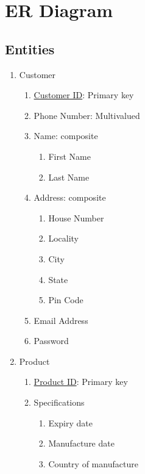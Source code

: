 \documentclass[12pt]{report}
\begin{document}
    \chapter{ER Diagram}
    \section{Entities}

    \begin{enumerate}
        \item Customer
            \begin{enumerate}
                \item \underline{Customer ID}: Primary key
                \item Phone Number: Multivalued
                \item Name: composite
                    \begin{enumerate}
                        \item First Name
                        \item Last Name
                    \end{enumerate}
                \item Address: composite
                    \begin{enumerate}
                        \item House Number
                        \item Locality
                        \item City
                        \item State
                        \item Pin Code
                    \end{enumerate}
                \item Email Address
                \item Password
            \end{enumerate}
        \item Product
            \begin{enumerate}
                \item \underline{Product ID}: Primary key
                \item Specifications
                    \begin{enumerate}
                        \item Expiry date
                        \item Manufacture date
                        \item Country of manufacture

\end{enumerate}
\end{enumerate}
\end{enumerate}
\end{document}
